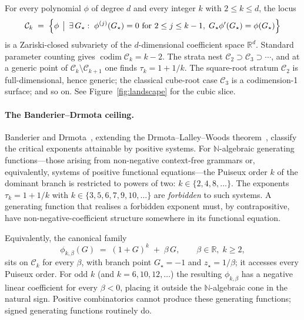 \documentclass[11pt,a4paper]{article}
\newcommand{\NN}{\mathbb{N}}
\newcommand{\RR}{\mathbb{R}}
\newcommand{\Ck}{\mathcal{C}}
\theoremstyle{plain}
\theoremstyle{remark}
\begin{document}
For every polynomial $\phi$ of degree $d$ and every integer
$k$ with $2\leq k\leq d$, the locus
\begin{equation}
  \Ck_{k}
  \;=\;
  \Bigl\{\phi\,\bigm|\,
  \exists\,G_{\star}:\;
  \phi^{(j)}(G_{\star}) = 0\text{ for } 2\leq j\leq k-1,\;
  G_{\star}\phi'(G_{\star}) = \phi(G_{\star})
  \Bigr\}
  \label{eq:stratum}
\end{equation}
is a Zariski-closed subvariety of the $d$-dimensional coefficient
space $\RR^{d}$.  Standard parameter counting gives
$\operatorname{codim}\Ck_{k} = k-2$.  The strata nest
$\Ck_{2}\supset\Ck_{3}\supset\cdots$, and at a generic point of
$\Ck_{k}\setminus\Ck_{k+1}$ one finds $\tau_{k} = 1+1/k$.  The
square-root stratum $\Ck_{2}$ is full-dimensional, hence
generic; the classical cube-root case $\Ck_{3}$ is a
codimension-1 surface; and so on.  See
Figure~\ref{fig:landscape} for the cubic slice.

\paragraph{The Banderier--Drmota ceiling.}
Banderier and Drmota~\citep{BanderierDrmota2015}, extending the
Drmota--Lalley--Woods theorem~\citep{DrmotaLalleyWoods},
classify the critical exponents attainable by positive systems.
For $\NN$-algebraic generating functions---those arising from
non-negative context-free grammars or, equivalently, systems of
positive functional equations---the Puiseux order $k$ of the
dominant branch is restricted to powers of two:
$k\in\{2,4,8,\dots\}$.  The exponents $\tau_{k} = 1+1/k$ with
$k\in\{3,5,6,7,9,10,\dots\}$ are \emph{forbidden} to such
systems.  A generating function that realises a forbidden
exponent must, by contrapositive, have non-negative-coefficient
structure somewhere in its functional equation.

Equivalently, the canonical family
\begin{equation}
  \phi_{k,\beta}(G) \;=\; (1+G)^{k} \;+\; \beta\,G,
  \qquad\beta\in\RR,\; k\geq 2,
  \label{eq:canonical}
\end{equation}
sits on $\Ck_{k}$ for every $\beta$, with branch point
$G_{\star} = -1$ and $z_{\star} = 1/\beta$; it accesses every
Puiseux order.  For odd $k$ (and $k=6,10,12,\dots$) the
resulting $\phi_{k,\beta}$ has a negative linear coefficient for
every $\beta<0$, placing it outside the $\NN$-algebraic cone in
the natural sign.  Positive combinatorics cannot produce these
generating functions; signed generating functions routinely do.
\end{document}
